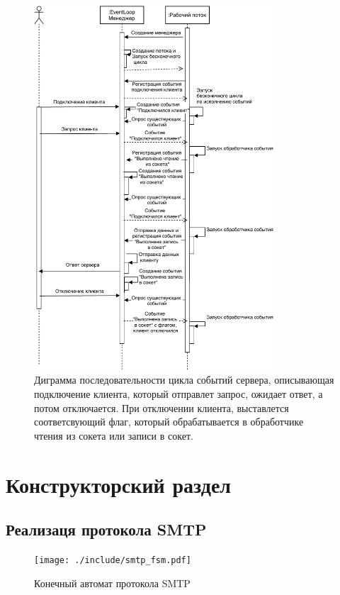 \documentclass[a4paper,12pt]{report}
\begin{document}
	\begin{figure}[H]
		\centering
		\includegraphics[width=0.8\textwidth]{./resource/SequenceDiagram_EventLoop.pdf}
		\caption{ Диграмма последовательности цикла событий сервера, описывающая подключение клиента, который отправлет запрос, ожидает ответ, а потом отключается. При отключении клиента, выставлется соответсвующий флаг, который обрабатывается в обработчике чтения из сокета или записи в сокет.} \label{fig:EventLoopSequence}
	\end{figure}


 \chapter{Конструкторский раздел}

 \section{Реализаця протокола SMTP}
    
    \begin{figure}[h]
	\centering
	\texttt{[image: ./include/smtp\_fsm.pdf]}
	\caption{Конечный автомат протокола SMTP}
	\label{fig:smtp_fsm}
\end{figure}
\end{document}
